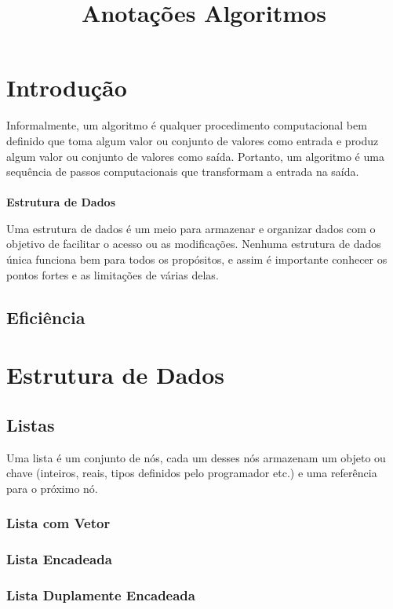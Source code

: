 \documentclass[10pt,a4paper]{article}
\title{Anotações Algoritmos}
\begin{document}
\maketitle
\tableofcontents
\newpage

\section{Introdução}
Informalmente, um algoritmo é qualquer procedimento computacional bem definido que toma algum valor ou conjunto de valores como entrada e produz algum valor ou conjunto de valores como saída. Portanto, um algoritmo é uma sequência de passos computacionais que transformam a entrada na saída.\\\\
\textbf{Estrutura de Dados}

Uma estrutura de dados é um meio para armazenar e organizar dados com o objetivo de facilitar o acesso ou as modificações. Nenhuma estrutura de dados única funciona bem para todos os propósitos, e assim é importante conhecer os pontos fortes e as limitações de várias delas.

\subsection{Eficiência}
\section{Estrutura de Dados}

\subsection{Listas}

\begin{df}
	Uma lista é um conjunto de nós, cada um desses nós armazenam um objeto ou chave (inteiros, reais, tipos definidos pelo programador etc.) e uma referência para o próximo nó.
\end{df}


\subsubsection{Lista com Vetor}
\subsubsection{Lista Encadeada}
\subsubsection{Lista Duplamente Encadeada}
\end{document}
